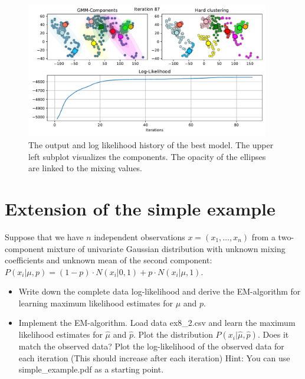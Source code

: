 \documentclass[12pt]{article}
\begin{document}
    \begin{figure}[H]
        \centering
        \includegraphics[width=0.95\textwidth]{GMM_task1.pdf}
        \caption{The output and log likelihood history of the best model. The upper left subplot visualizes the components. The opacity of the ellipses are linked to the mixing values.}
    \end{figure}

\section{Extension of the simple example}
    \begin{tcolorbox}[breakable]
        Suppose that we have $n$ independent observations $x = (x_1,\ldots,x_n )$ from a two-component mixture of univariate Gaussian distribution with unknown mixing coefficients and unknown mean of the second component: $P(x_i |\mu,p) = (1-p) \cdot N(x_i|0,1) + p \cdot N(x_i|\mu,1).$ 
        \begin{itemize}
            \item Write down the complete data log-likelihood and derive the EM-algorithm for learning maximum likelihood estimates for $\mu$ and $p$. 
            \item Implement the EM-algorithm. Load data ex8\_2.csv and learn the maximum likelihood estimates for $\hat{\mu}$ and $\hat{p}$. Plot the distribution $P(x_i| \hat{\mu}, \hat{p}).$ Does it match the observed data? Plot the log-likelihood of the observed data for each iteration (This should increase after each iteration) Hint: You can use simple\_example.pdf as a starting point.    
        \end{itemize}
    \end{tcolorbox}

    \def\zo{{z_{i1}}}
    \def\zt{{z_{i2}}}
    
\end{document}
